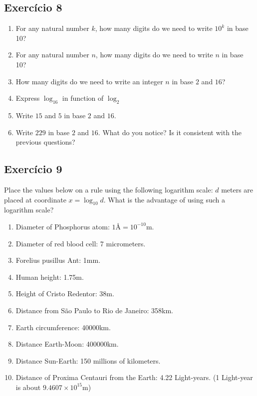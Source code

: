 \subsection*{Exercício 8}

\begin{enumerate}
\item For any natural number $k$, how many digits do we need to write $10^k$
  in base 10?
\item For any natural number $n$, how many digits do we need to write $n$
  in base 10?
\item How many digits do we need to write an integer $n$ in base $2$ and $16$?
\item Express $\log_{16}$ in function of $\log_{2}$
\item Write $15$ and $5$ in base $2$ and $16$.
\item Write $229$ in base $2$ and $16$. What do you notice?
  Is it consistent with the previous questions?
\end{enumerate}

\subsection*{Exercício 9}

Place the values below on a rule using the following logarithm scale:
$d$ meters are placed at coordinate $x = \log_{10} d$. What is the advantage of
using such a logarithm scale?

\begin{enumerate}
\item Diameter of Phosphorus atom: $1\text{Å} = 10^{-10}\text{m}$.
\item Diameter of red blood cell: 7 micrometers.
\item Forelius pusillus Ant: 1mm.
\item Human height: 1.75m.
\item Height of Cristo Redentor: 38m.
\item Distance from São Paulo to Rio de Janeiro: 358km.
\item Earth circumference: 40000km.
\item Distance Earth-Moon: 400000km.
\item Distance Sun-Earth: 150 millions of kilometers.
\item Distance of Proxima Centauri from the Earth: 4.22 Light-years.
  (1 Light-year is about $9.4607 \times 10^{15} \text{m}$)
\end{enumerate}

